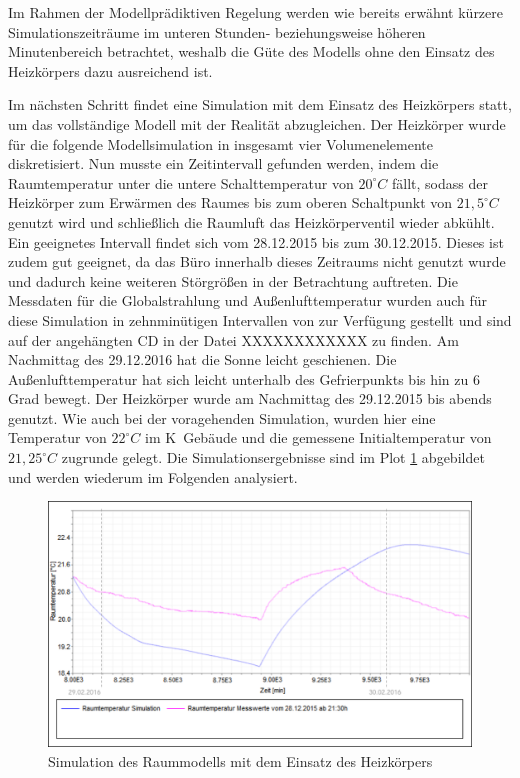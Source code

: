 Im Rahmen der Modellprädiktiven Regelung werden wie bereits erwähnt kürzere Simulationszeiträume im unteren Stunden- beziehungsweise höheren Minutenbereich betrachtet, weshalb die Güte des Modells ohne den Einsatz des Heizkörpers dazu ausreichend ist.

Im nächsten Schritt findet eine Simulation mit dem Einsatz des Heizkörpers statt, um das vollständige Modell mit der Realität abzugleichen. Der Heizkörper wurde für die folgende Modellsimulation in insgesamt vier Volumenelemente diskretisiert.
Nun musste ein Zeitintervall gefunden werden, indem die Raumtemperatur unter die untere Schalttemperatur von $20^{\circ}C$ fällt, sodass der Heizkörper zum Erwärmen des Raumes bis zum oberen Schaltpunkt von $21,5^{\circ}C$ genutzt wird und  schließlich die Raumluft das Heizkörperventil wieder abkühlt. Ein geeignetes Intervall findet sich vom 28.12.2015 bis zum 30.12.2015. Dieses ist zudem gut geeignet, da das Büro innerhalb dieses Zeitraums nicht genutzt wurde und dadurch keine weiteren Störgrößen in der Betrachtung auftreten.
Die Messdaten für die Globalstrahlung und Außenlufttemperatur wurden auch für diese Simulation in zehnminütigen Intervallen von \cite{wetter} zur Verfügung gestellt und sind auf der angehängten CD in der Datei XXXXXXXXXXXX zu finden. Am Nachmittag des 29.12.2016 hat die Sonne leicht geschienen. Die Außenlufttemperatur hat sich leicht unterhalb des Gefrierpunkts bis hin zu 6 Grad bewegt. Der Heizkörper wurde am Nachmittag des 29.12.2015 bis abends genutzt.
Wie auch bei der voragehenden Simulation, wurden hier eine Temperatur von $22^{\circ}C$ im K~Gebäude und die gemessene Initialtemperatur von $21,25^{\circ}C$ zugrunde gelegt. Die Simulationsergebnisse sind im Plot \ref{fig:valid2} abgebildet und werden wiederum im Folgenden analysiert.

\begin{figure}
\centering
\includegraphics[width=\textwidth]{abbildungen/20160328_validierung2}
\caption{Simulation des Raummodells mit dem Einsatz des Heizkörpers}
\label{fig:valid2}
\end{figure}

